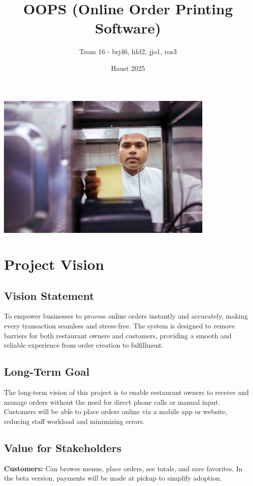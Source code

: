 \documentclass{article}
\title{OOPS (Online Order Printing Software)}
\author{Team 16 - brj46, hfd2, jjo1, ros3}
\date{Haust 2025}
\begin{document}
\maketitle

\vspace{5em}
\begin{center}
    \includegraphics[width=0.8\textwidth]{imgs/order-in-kitchen.jpg}
\end{center}


\newpage

\section{Project Vision}

\subsection{Vision Statement}
To empower businesses to process online orders instantly and accurately, making every transaction seamless and stress-free. The system is designed to remove barriers for both restaurant owners and customers, providing a smooth and reliable experience from order creation to fulfillment.

\subsection{Long-Term Goal}
The long-term vision of this project is to enable restaurant owners to receive and manage orders without the need for direct phone calls or manual input. Customers will be able to place orders online via a mobile app or website, reducing staff workload and minimizing errors.

\subsection{Value for Stakeholders}
\textbf{Customers:} Can browse menus, place orders, see totals, and save favorites. In the beta version, payments will be made at pickup to simplify adoption.\\
\end{document}

